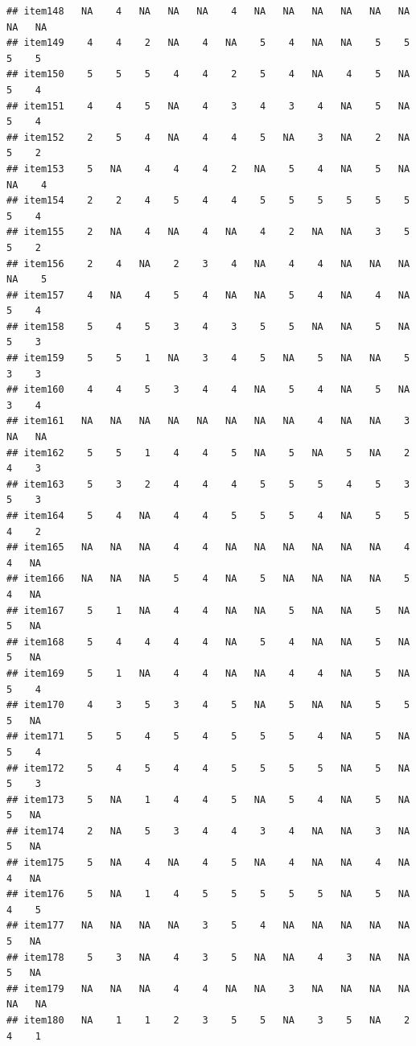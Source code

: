 \documentclass[
  man]{apa6}
\begin{document}
\begin{verbatim}
## item148   NA    4   NA   NA   NA    4   NA   NA   NA   NA   NA   NA   NA   NA
## item149    4    4    2   NA    4   NA    5    4   NA   NA    5    5    5    5
## item150    5    5    5    4    4    2    5    4   NA    4    5   NA    5    4
## item151    4    4    5   NA    4    3    4    3    4   NA    5   NA    5    4
## item152    2    5    4   NA    4    4    5   NA    3   NA    2   NA    5    2
## item153    5   NA    4    4    4    2   NA    5    4   NA    5   NA   NA    4
## item154    2    2    4    5    4    4    5    5    5    5    5    5    5    4
## item155    2   NA    4   NA    4   NA    4    2   NA   NA    3    5    5    2
## item156    2    4   NA    2    3    4   NA    4    4   NA   NA   NA   NA    5
## item157    4   NA    4    5    4   NA   NA    5    4   NA    4   NA    5    4
## item158    5    4    5    3    4    3    5    5   NA   NA    5   NA    5    3
## item159    5    5    1   NA    3    4    5   NA    5   NA   NA    5    3    3
## item160    4    4    5    3    4    4   NA    5    4   NA    5   NA    3    4
## item161   NA   NA   NA   NA   NA   NA   NA   NA    4   NA   NA    3   NA   NA
## item162    5    5    1    4    4    5   NA    5   NA    5   NA    2    4    3
## item163    5    3    2    4    4    4    5    5    5    4    5    3    5    3
## item164    5    4   NA    4    4    5    5    5    4   NA    5    5    4    2
## item165   NA   NA   NA    4    4   NA   NA   NA   NA   NA   NA    4    4   NA
## item166   NA   NA   NA    5    4   NA    5   NA   NA   NA   NA    5    4   NA
## item167    5    1   NA    4    4   NA   NA    5   NA   NA    5   NA    5   NA
## item168    5    4    4    4    4   NA    5    4   NA   NA    5   NA    5   NA
## item169    5    1   NA    4    4   NA   NA    4    4   NA    5   NA    5    4
## item170    4    3    5    3    4    5   NA    5   NA   NA    5    5    5   NA
## item171    5    5    4    5    4    5    5    5    4   NA    5   NA    5    4
## item172    5    4    5    4    4    5    5    5    5   NA    5   NA    5    3
## item173    5   NA    1    4    4    5   NA    5    4   NA    5   NA    5   NA
## item174    2   NA    5    3    4    4    3    4   NA   NA    3   NA    5   NA
## item175    5   NA    4   NA    4    5   NA    4   NA   NA    4   NA    4   NA
## item176    5   NA    1    4    5    5    5    5    5   NA    5   NA    4    5
## item177   NA   NA   NA   NA    3    5    4   NA   NA   NA   NA   NA    5   NA
## item178    5    3   NA    4    3    5   NA   NA    4    3   NA   NA    5   NA
## item179   NA   NA   NA    4    4   NA   NA    3   NA   NA   NA   NA   NA   NA
## item180   NA    1    1    2    3    5    5   NA    3    5   NA    2    4    1

\end{verbatim}
\end{document}
